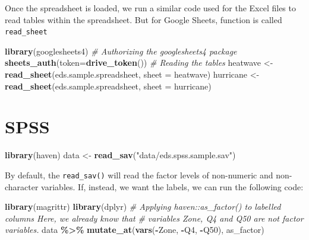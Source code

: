 \documentclass[
]{book}
\newenvironment{Shaded}{\begin{snugshade}}{\end{snugshade}}
\newcommand{\CommentTok}[1]{\textcolor[rgb]{0.56,0.35,0.01}{\textit{#1}}}
\newcommand{\DataTypeTok}[1]{\textcolor[rgb]{0.13,0.29,0.53}{#1}}
\newcommand{\KeywordTok}[1]{\textcolor[rgb]{0.13,0.29,0.53}{\textbf{#1}}}
\newcommand{\NormalTok}[1]{#1}
\newcommand{\OperatorTok}[1]{\textcolor[rgb]{0.81,0.36,0.00}{\textbf{#1}}}
\newcommand{\StringTok}[1]{\textcolor[rgb]{0.31,0.60,0.02}{#1}}
\begin{document}
Once the spreadsheet is loaded, we run a similar code used for the Excel files to read tables within the spreadsheet. But for Google Sheets, function is called \texttt{read\_sheet}

\begin{Shaded}
\begin{Highlighting}[]
\KeywordTok{library}\NormalTok{(googlesheets4)}
\CommentTok{\# Authorizing the googlesheets4 package}
\KeywordTok{sheets\_auth}\NormalTok{(}\DataTypeTok{token=}\KeywordTok{drive\_token}\NormalTok{())}
\CommentTok{\# Reading the tables}
\NormalTok{heatwave \textless{}{-}}\StringTok{ }\KeywordTok{read\_sheet}\NormalTok{(eds.sample.spreadsheet, }\DataTypeTok{sheet =} \StringTok{\textquotesingle{}heatwave\textquotesingle{}}\NormalTok{)}
\NormalTok{hurricane \textless{}{-}}\StringTok{ }\KeywordTok{read\_sheet}\NormalTok{(eds.sample.spreadsheet, }\DataTypeTok{sheet =} \StringTok{\textquotesingle{}hurricane\textquotesingle{}}\NormalTok{)}
\end{Highlighting}
\end{Shaded}

\hypertarget{spss}{%
\section{SPSS}\label{spss}}

\begin{Shaded}
\begin{Highlighting}[]
\KeywordTok{library}\NormalTok{(haven)}
\NormalTok{data \textless{}{-}}\StringTok{ }\KeywordTok{read\_sav}\NormalTok{(}\StringTok{"data/eds.spss.sample.sav"}\NormalTok{)}
\end{Highlighting}
\end{Shaded}

By default, the \texttt{read\_sav()} will read the factor levels of non-numeric and non-character variables. If, instead, we want the labels, we can run the following code:

\begin{Shaded}
\begin{Highlighting}[]
\KeywordTok{library}\NormalTok{(magrittr)}
\KeywordTok{library}\NormalTok{(dplyr)}
\CommentTok{\# Applying haven::as\_factor() to labelled columns Here, we already know that}
\CommentTok{\# variables Zone, Q4 and Q50 are not factor variables.}
\NormalTok{data }\OperatorTok{\%\textgreater{}\%}\StringTok{ }\KeywordTok{mutate\_at}\NormalTok{(}\KeywordTok{vars}\NormalTok{(}\OperatorTok{{-}}\NormalTok{Zone, }\OperatorTok{{-}}\NormalTok{Q4, }\OperatorTok{{-}}\NormalTok{Q50), as\_factor)}
\end{Highlighting}
\end{Shaded}
\end{document}
